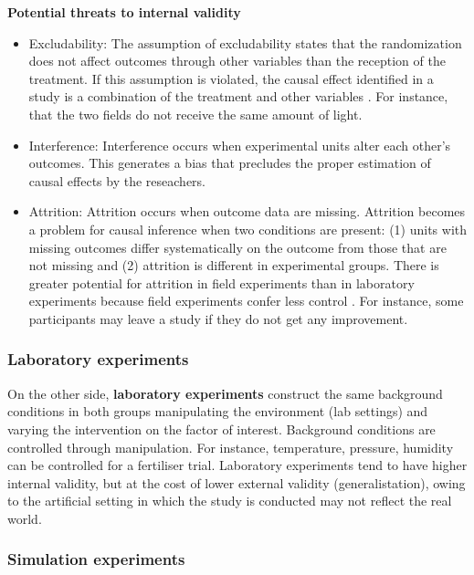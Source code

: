 \documentclass[
]{book}
\begin{document}
\textbf{Potential threats to internal validity}

\begin{itemize}
\item
  Excludability: The assumption of excludability states that the randomization does not affect outcomes through other variables than the reception of the treatment. If this assumption is violated, the causal effect identified in a study is a combination of the treatment and other variables \citep{hansen2020systematic}. For instance, that the two fields do not receive the same amount of light.
\item
  Interference: Interference occurs when experimental units alter each other's outcomes. This generates a bias that precludes the proper estimation of causal effects by the reseachers.
\item
  Attrition: Attrition occurs when outcome data are missing. Attrition becomes a problem for causal inference when two conditions are present: (1) units with missing outcomes differ systematically on the outcome from those that are not missing and (2) attrition is different in experimental groups. There is greater potential for attrition in field experiments than in laboratory experiments because field experiments confer less control \citep{hansen2020systematic}. For instance, some participants may leave a study if they do not get any improvement.
\end{itemize}

\hypertarget{laboratory-experiments}{%
\subsubsection{Laboratory experiments}\label{laboratory-experiments}}

On the other side, \textbf{laboratory experiments} construct the same background conditions in both groups manipulating the environment (lab settings) and varying the intervention on the factor of interest. Background conditions are controlled through manipulation. For instance, temperature, pressure, humidity can be controlled for a fertiliser trial. Laboratory experiments tend to have higher internal validity, but at the cost of lower external validity (generalistation), owing to the artificial setting in which the study is conducted may not reflect the real world.

\hypertarget{simulation-experiments}{%
\subsubsection{Simulation experiments}\label{simulation-experiments}}
\end{document}
